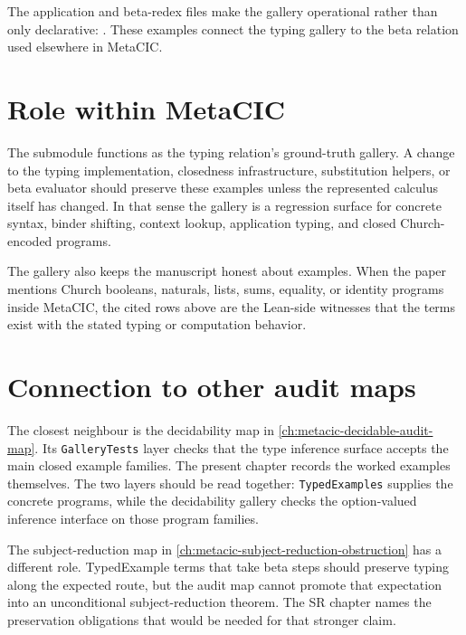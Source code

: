 The application and beta-redex files make the gallery operational rather than
only declarative:
.
These examples connect the typing gallery to the beta relation used elsewhere
in MetaCIC.

\section{Role within MetaCIC}
\label{sec:metacic-typedexamples-audit-map-role}

The submodule functions as the typing relation's ground-truth gallery. A change
to the typing implementation, closedness infrastructure, substitution helpers,
or beta evaluator should preserve these examples unless the represented
calculus itself has changed. In that sense the gallery is a regression surface
for concrete syntax, binder shifting, context lookup, application typing, and
closed Church-encoded programs.

The gallery also keeps the manuscript honest about examples. When the paper
mentions Church booleans, naturals, lists, sums, equality, or identity programs
inside MetaCIC, the cited rows above are the Lean-side witnesses that the terms
exist with the stated typing or computation behavior.

\section{Connection to other audit maps}
\label{sec:metacic-typedexamples-audit-map-connection}

The closest neighbour is the decidability map in
\autoref{ch:metacic-decidable-audit-map}. Its \texttt{GalleryTests} layer checks
that the type inference surface accepts the main closed example families. The
present chapter records the worked examples themselves. The two layers should
be read together: \texttt{TypedExamples} supplies the concrete programs, while
the decidability gallery checks the option-valued inference interface on those
program families.

The subject-reduction map in
\autoref{ch:metacic-subject-reduction-obstruction} has a different role.
TypedExample terms that take beta steps should preserve typing along the
expected route, but the audit map cannot promote that expectation into an
unconditional subject-reduction theorem. The SR chapter names the preservation
obligations that would be needed for that stronger claim.

